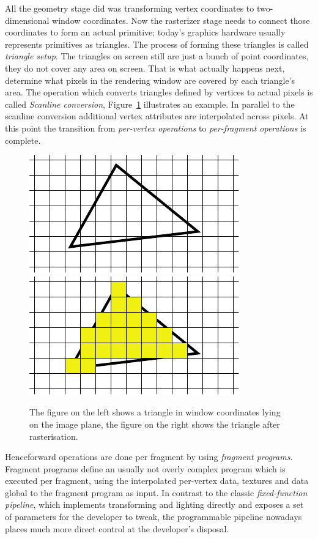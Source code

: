 All the geometry stage did was transforming vertex coordinates to
two-dimensional window coordinates. Now the rasterizer stage needs to connect
those coordinates to form an actual primitive; today's graphics hardware usually
represents primitives as triangles. The process of forming these triangles is
called \textit{triangle setup}. The triangles on screen still are just a bunch
of point coordinates, they do not cover any area on screen. That is what
actually happens next, determine what pixels in the rendering window are covered
by each triangle's area. The operation which converts triangles defined by
vertices to actual pixels is called \textit{Scanline conversion},
Figure~\ref{fig:rasteriser} illustrates an example. In parallel to the scanline
conversion additional vertex attributes are interpolated across pixels. At this
point the transition from \textit{per-vertex operations} to \textit{per-fragment
operations} is complete.
\begin{figure}[b]
\centering
\subfigure
{
  \includegraphics[scale=1.0]{Images/Rasteriser1.pdf}
  \label{fig:subfigrasteriser1}
}
\subfigure
{
  \includegraphics[scale=1.0]{Images/Rasteriser2.pdf}
  \label{fig:subfigrasteriser2}
}
\caption[Triangle Rasterisation]{The figure on the left shows a triangle in
window coordinates lying on the image plane, the figure on the right shows the
triangle after rasterisation.}
\label{fig:rasteriser}
\end{figure}

Henceforward operations are done per fragment by using \textit{fragment
programs}. Fragment programs define an usually not overly complex program which
is executed per fragment, using the interpolated per-vertex data, textures and
data global to the fragment program as input. In contrast to the classic
\textit{fixed-function pipeline}, which implements transforming and lighting
directly and exposes a set of parameters for the developer to tweak, the
programmable pipeline nowadays places much more direct control at the
developer's disposal.

